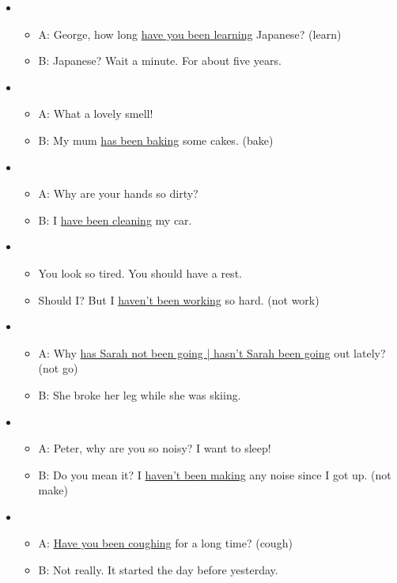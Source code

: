 \begin{itemize}

\item
\begin{itemize}
\item A: George, how long \underline{have you been learning} Japanese? (learn)
\item B: Japanese? Wait a minute. For about five years.
\end{itemize}

\item
\begin{itemize}
\item A: What a lovely smell!
\item B: My mum \underline{has been baking} some cakes. (bake)
\end{itemize}

\item
\begin{itemize}
\item A: Why are your hands so dirty?
\item B: I \underline{have been cleaning} my car.
\end{itemize}

\item
\begin{itemize}
\item You look so tired. You should have a rest.
\item Should I? But I \underline{haven't been working} so hard. (not work)
\end{itemize}

\item
\begin{itemize}
\item A: Why \underline{has Sarah not been going | hasn't Sarah been going} out lately? (not go)
\item B: She broke her leg while she was skiing.
\end{itemize}

\item
\begin{itemize}
\item A: Peter, why are you so noisy? I want to sleep!
\item B: Do you mean it? I \underline{haven't been making} any noise since I got up. (not make)
\end{itemize}

\item
\begin{itemize}
\item A: \underline{Have you been coughing} for a long time? (cough)
\item B: Not really. It started the day before yesterday.
\end{itemize}


\end{itemize}
